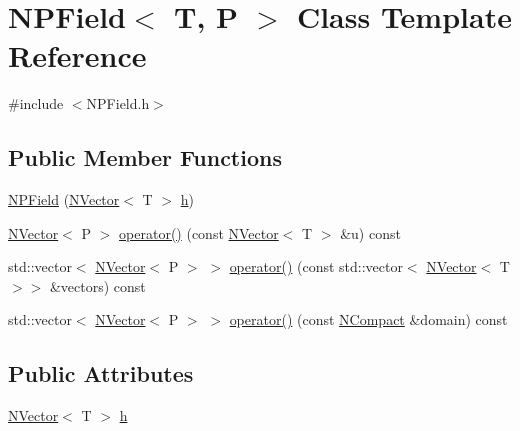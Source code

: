 \hypertarget{class_n_p_field}{}\section{N\+P\+Field$<$ T, P $>$ Class Template Reference}
\label{class_n_p_field}


{\ttfamily \#include $<$N\+P\+Field.\+h$>$}

\subsection*{Public Member Functions}
\begin{DoxyCompactItemize}
\item 
\mbox{\hyperlink{class_n_p_field_a0b08c6aed14b5085470849dd5c1e2aa7}{N\+P\+Field}} (\mbox{\hyperlink{class_n_vector}{N\+Vector}}$<$ T $>$ \mbox{\hyperlink{class_n_p_field_a21a56864db47d8589ec917764e3b2b85}{h}})
\item 
\mbox{\hyperlink{class_n_vector}{N\+Vector}}$<$ P $>$ \mbox{\hyperlink{class_n_p_field_a725b9522a0a0657b6923412a597802fd}{operator()}} (const \mbox{\hyperlink{class_n_vector}{N\+Vector}}$<$ T $>$ \&u) const
\item 
std\+::vector$<$ \mbox{\hyperlink{class_n_vector}{N\+Vector}}$<$ P $>$ $>$ \mbox{\hyperlink{class_n_p_field_af6e57701609dae20abff2d2186f6359b}{operator()}} (const std\+::vector$<$ \mbox{\hyperlink{class_n_vector}{N\+Vector}}$<$ T $>$$>$ \&vectors) const
\item 
std\+::vector$<$ \mbox{\hyperlink{class_n_vector}{N\+Vector}}$<$ P $>$ $>$ \mbox{\hyperlink{class_n_p_field_a072ef720318bdbca19ca0a6602469c87}{operator()}} (const \mbox{\hyperlink{class_n_compact}{N\+Compact}} \&domain) const
\end{DoxyCompactItemize}
\subsection*{Public Attributes}
\begin{DoxyCompactItemize}
\item 
\mbox{\hyperlink{class_n_vector}{N\+Vector}}$<$ T $>$ \mbox{\hyperlink{class_n_p_field_a21a56864db47d8589ec917764e3b2b85}{h}}
\end{DoxyCompactItemize}
